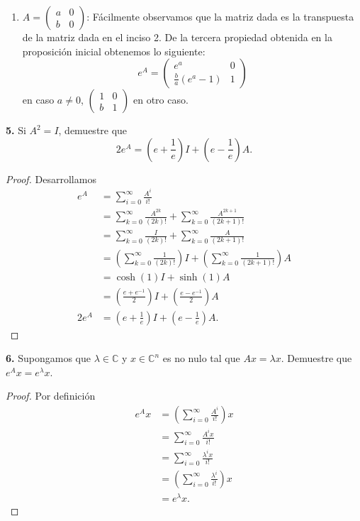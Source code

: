 \documentclass{article}
\newenvironment{statement}[1]{\smallskip\noindent\color[rgb]{1.00,0.00,0.50} {\bf #1.}}{}
\theoremstyle{definition}
\theoremstyle{remark}
\newcommand{\BC}{\mathbb C}
\begin{document}
\begin{enumerate}
  \item
    $A = \begin{pmatrix} a & 0 \\ b & 0 \end{pmatrix}$:
    F\'acilmente observamos que la matriz dada es la transpuesta de la matriz
    dada en el inciso 2. De la tercera propiedad obtenida en la proposici\'on
    inicial obtenemos lo siguiente:
    \[
      e^A = \begin{pmatrix} e^a & 0 \\ \frac{b}{a}(e^a - 1) & 1 \end{pmatrix}
    \]
    en caso $a \neq 0$,
    $\begin{pmatrix}
      1 & 0 \\
      b & 1
    \end{pmatrix}$
    en otro caso.
\end{enumerate}

\begin{statement}{5}
  Si $A^2 = I$, demuestre que
  \[
    2 e^A = (e + \frac{1}{e}) I + (e - \frac{1}{e}) A.
  \]
\end{statement}

\begin{proof}
  Desarrollamos
  \begin{align*}
    e^A &= \sum_{i = 0}^{\infty} \frac{A^i}{i!}\\
    &= \sum_{k = 0}^{\infty} \frac{A^{2k}}{(2k)!} + \sum_{k = 0}^{\infty} \frac{A^{2k + 1}}{(2k + 1)!}\\
    &= \sum_{k = 0}^{\infty} \frac{I}{(2k)!} + \sum_{k = 0}^{\infty} \frac{A}{(2k + 1)!}\\
    &= \left(\sum_{k = 0}^{\infty} \frac{1}{(2k)!}\right) I + \left(\sum_{k = 0}^{\infty} \frac{1}{(2k + 1)!}\right) A\\
    &= \cosh(1) I + \sinh(1) A\\
    &= \left(\frac{e + e^{-1}}{2}\right) I + \left(\frac{e - e^{-1}}{2}\right) A\\
    2 e^A &= \left(e + \frac{1}{e}\right) I + \left(e - \frac{1}{e}\right) A.
  \end{align*}
\end{proof}

\begin{statement}{6}
  Supongamos que $\lambda \in \BC$ y $x \in \BC^n$ es no nulo tal que $Ax = \lambda x$.
  Demuestre que $e^A x = e^{\lambda} x$.
\end{statement}

\begin{proof}
  Por definici\'on
  \begin{align*}
    e^A x &= \left(\sum_{i = 0}^{\infty} \frac{A^i}{i!}\right) x\\
    &= \sum_{i = 0}^{\infty} \frac{A^i x}{i!}\\
    &= \sum_{i = 0}^{\infty} \frac{\lambda^i x}{i!}\\
    &= \left(\sum_{i = 0}^{\infty} \frac{\lambda^i}{i!}\right) x\\
    &= e^{\lambda} x.
  \end{align*}
\end{proof}
\end{document}
